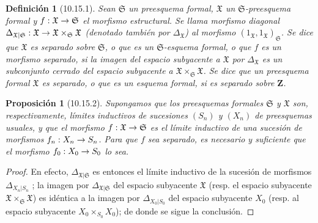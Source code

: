 \documentclass[oneside]{amsart}
\theoremstyle{ega-env-style}
\theoremstyle{ega-thm-env-style}
\newtheorem*{proposition}{Proposición}
\theoremstyle{ega-defn-env-style}
\newtheorem*{definition}{Definición}
\renewcommand{\to}{\mathchoice{\longrightarrow}{\rightarrow}{\rightarrow}{\rightarrow}}
\let\EGAOriginalLabel\label
\renewcommand{\label}[1]{\phantomsection\EGAOriginalLabel{#1}}
\begin{document}
\begin{definition}[10.15.1]
\label{I.10.15.1}
Sean $\mathfrak{S}$ un preesquema formal, $\mathfrak{X}$ un $\mathfrak{S}$-preesquema formal y $f:\mathfrak{X}\to\mathfrak{S}$ el morfismo estructural.
Se llama morfismo diagonal $\Delta_{\mathfrak{X}|\mathfrak{S}}:\mathfrak{X}\to
\mathfrak{X}\times_{\mathfrak{S}}\mathfrak{X}$ (denotado también por $\Delta_{\mathfrak{X}}$) al morfismo $(1_{\mathfrak{X}},1_{\mathfrak{X}})_{\mathfrak{S}}$.
Se dice que $\mathfrak{X}$ es separado sobre $\mathfrak{S}$, o que es un $\mathfrak{S}$-esquema formal, o que $f$ es un morfismo separado, si la imagen del espacio subyacente a $\mathfrak{X}$ por $\Delta_{\mathfrak{X}}$ es un subconjunto cerrado del espacio subyacente a $\mathfrak{X}\times_{\mathfrak{S}}\mathfrak{X}$.
Se dice que un preesquema formal $\mathfrak{X}$ es separado, o que es un esquema formal, si es separado sobre $\mathbf{Z}$.
\end{definition}

\begin{proposition}[10.15.2]
\label{I.10.15.2}
Supongamos que los preesquemas formales $\mathfrak{S}$ y $\mathfrak{X}$ son, respectivamente, límites inductivos de sucesiones $(S_n)$ y $(X_n)$ de preesquemas usuales, y que el morfismo $f:\mathfrak{X}\to\mathfrak{S}$ es el límite inductivo de una sucesión de morfismos $f_n:X_n\to S_n$.
Para que $f$ sea separado, es necesario y suficiente que el morfismo $f_0:X_0\to S_0$ lo sea.
\end{proposition}

\begin{proof}
En efecto, $\Delta_{\mathfrak{X}|\mathfrak{S}}$ es entonces el límite inductivo de la sucesión de morfismos $\Delta_{X_n|S_n}$ ; la imagen por $\Delta_{\mathfrak{X}|\mathfrak{S}}$ del espacio subyacente $\mathfrak{X}$ (resp. el espacio subyacente $\mathfrak{X}\times_{\mathfrak{S}}\mathfrak{X}$) es idéntica a la imagen por $\Delta_{X_0|S_0}$ del espacio subyacente $X_0$ (resp. al espacio subyacente $X_0\times_{S_0}X_0$);
de donde se sigue la conclusión.
\end{proof}
\end{document}
